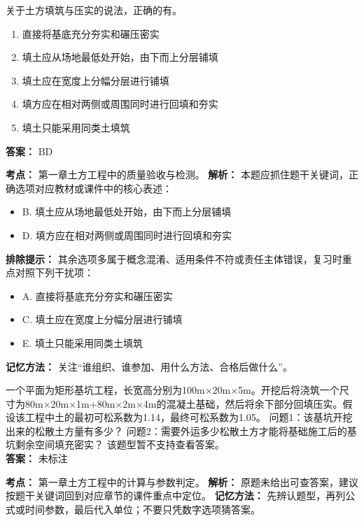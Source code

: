 \documentclass[UTF8,fontset=fandol,11pt]{ctexart}
\begin{document}
\begin{quizbox}[title={第 32 题}]
关于土方填筑与压实的说法，正确的有。\\
\begin{enumerate}[label=\Alph*.]
\item 直接将基底充分夯实和碾压密实
\item 填土应从场地最低处开始，由下而上分层铺填
\item 填土应在宽度上分幅分层进行铺填
\item 填方应在相对两侧或周围同时进行回填和夯实
\item 填土只能采用同类土填筑
\end{enumerate}
\textbf{答案：} BD
\vspace{0.25em}
\begin{answerbox}[title={考点解析}]
\textbf{考点：} 第一章土方工程中的质量验收与检测。
\textbf{解析：} 本题应抓住题干关键词，正确选项对应教材或课件中的核心表述：
\begin{itemize}
\item B. 填土应从场地最低处开始，由下而上分层铺填
\item D. 填方应在相对两侧或周围同时进行回填和夯实
\end{itemize}
\textbf{排除提示：} 其余选项多属于概念混淆、适用条件不符或责任主体错误，复习时重点对照下列干扰项：
\begin{itemize}
\item A. 直接将基底充分夯实和碾压密实
\item C. 填土应在宽度上分幅分层进行铺填
\item E. 填土只能采用同类土填筑
\end{itemize}
\textbf{记忆方法：} 关注“谁组织、谁参加、用什么方法、合格后做什么”。
\end{answerbox}
\end{quizbox}

\vspace{0.2em}

\begin{quizbox}[title={第 33 题}]
一个平面为矩形基坑工程，长宽高分别为100m×20m×5m。开挖后将浇筑一个尺寸为80m×20m×1m+80m×2m×4m的混凝土基础，然后将余下部分回填压实。假设该工程中土的最初可松系数为1.14，最终可松系数为1.05。 问题1：该基坑开挖出来的松散土方量有多少？ 问题2：需要外运多少松散土方才能将基础施工后的基坑剩余空间填充密实？ 该题型暂不支持查看答案。\\
\textbf{答案：} 未标注
\vspace{0.25em}
\begin{answerbox}[title={考点解析}]
\textbf{考点：} 第一章土方工程中的计算与参数判定。
\textbf{解析：} 原题未给出可查答案，建议按题干关键词回到对应章节的课件重点中定位。
\textbf{记忆方法：} 先辨认题型，再列公式或时间参数，最后代入单位；不要只凭数字选项猜答案。
\end{answerbox}
\end{quizbox}
\end{document}
